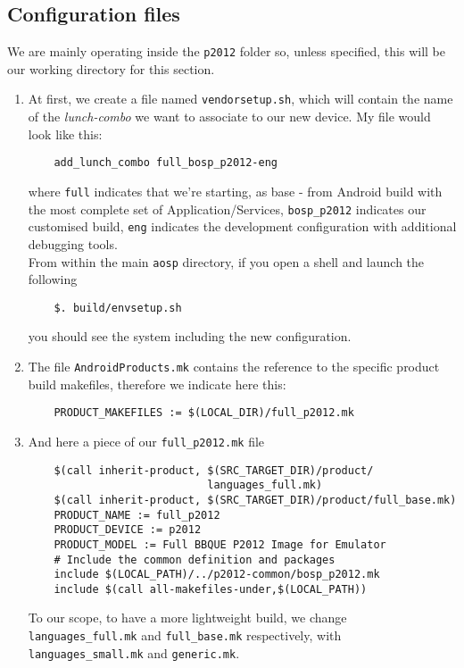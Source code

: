 \subsection{Configuration files}
\label{configuration}
We are mainly operating inside the \texttt{p2012} folder so, unless specified, this will be our working directory for this section.
\begin{enumerate}
\item \label{item-and-vendors} At first, we create a file named \texttt{vendorsetup.sh}, which will contain the name of the \textit{lunch-combo} we want to associate to our new device. My file would look like this:
\begin{verbatim}
	add_lunch_combo full_bosp_p2012-eng
\end{verbatim}
where \texttt{full} indicates that we're starting, as base - from Android build with the most complete set of Application/Services, \texttt{bosp\_p2012} indicates our customised build, \texttt{eng} indicates the development configuration with additional debugging tools.\\
From within the main \texttt{aosp} directory, if you open a shell and launch the following
\begin{verbatim}
	$. build/envsetup.sh
\end{verbatim}
you should see the system including the new configuration.
\item \label{item-and-prod} The file \texttt{AndroidProducts.mk} contains the reference to the specific product build makefiles, therefore we indicate here this:
\begin{verbatim}
	PRODUCT_MAKEFILES := $(LOCAL_DIR)/full_p2012.mk
\end{verbatim}
\item \label{item-and-makefile} And here a piece of our \texttt{full\_p2012.mk} file
\begin{verbatim}
	$(call inherit-product, $(SRC_TARGET_DIR)/product/
	                        languages_full.mk)
	$(call inherit-product, $(SRC_TARGET_DIR)/product/full_base.mk)
	PRODUCT_NAME := full_p2012
	PRODUCT_DEVICE := p2012
	PRODUCT_MODEL := Full BBQUE P2012 Image for Emulator
	# Include the common definition and packages
	include $(LOCAL_PATH)/../p2012-common/bosp_p2012.mk
	include $(call all-makefiles-under,$(LOCAL_PATH))
\end{verbatim}
To our scope, to have a more lightweight build, we change \texttt{languages\_full.mk} and \texttt{full\_base.mk} respectively, with \texttt{languages\_small.mk} and \texttt{generic.mk}.\\

\end{enumerate}
